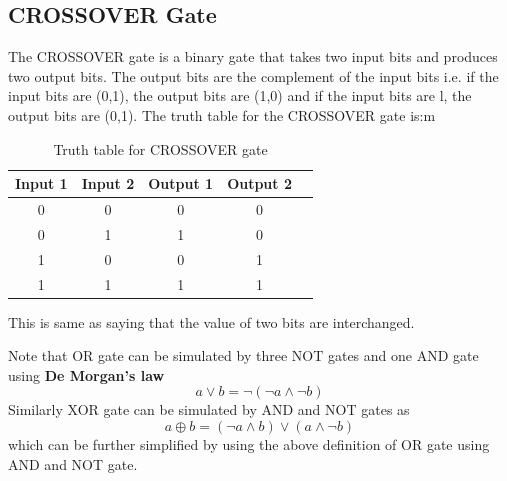 \subsection{CROSSOVER Gate}
The CROSSOVER gate is a binary gate that takes two input bits and produces two output bits. The output bits are the complement of the input bits i.e. if the input bits are (0,1), the output bits are (1,0) and if the input bits are l, the output bits are (0,1).
The truth table for the CROSSOVER gate is:m
\begin{table}[ht]
\centering
    \begin{tabular}{|c|c|c|c|c|}
        \hline
        Input 1 & Input 2 & Output 1 & Output 2 \\
        \hline
        0 & 0 & 0 & 0 \\
        0 & 1 & 1 & 0 \\
        1 & 0 & 0 & 1 \\
        1 & 1 & 1 & 1 \\
        \hline
    \end{tabular}
    \caption{Truth table for CROSSOVER gate}
    \label{tab:CROSSOVER_GATE}
\end{table}
This is same as saying that the value of two bits are interchanged.

Note that OR gate can be simulated by three NOT gates and one AND gate using \textbf{De Morgan's law}
\[
a\lor b=\neg(\neg a\land \neg b) 
\]
Similarly XOR gate can be simulated by AND and NOT gates as
\[
a \oplus b=(\neg a \land b) \lor (a\land \neg b)
\]
which can be further simplified by using the above definition of OR gate using AND and NOT gate.

